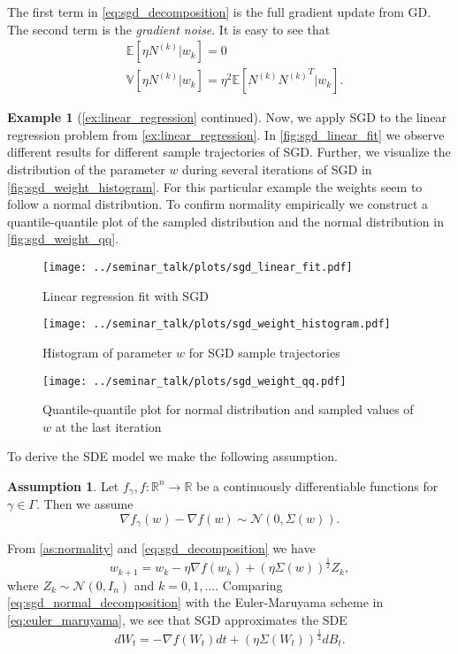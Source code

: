 \documentclass[12pt]{article}
\theoremstyle{definition}
\newtheorem{example}[example]{Example}
\newtheorem{assumption}[assumption]{Assumption}
\numberwithin{equation}{section}
\newcommand{\R}{\mathbb{R}}
\newcommand{\CN}{\mathcal{N}}
\newcommand{\ev}[1]{\mathbb{E}\left[{#1}\right]}
\newcommand{\var}[1]{\mathbb{V}\left[{#1}\right]}
\begin{document}
The first term in \eqref{eq:sgd_decomposition} is the full gradient update from GD. The second term is the \emph{gradient noise}. It is easy to see that 
\begin{align*}
  &\ev{\eta N^{(k)}|w_{k}} = 0 \\
  &\var{\eta N^{(k)}|w_{k}} = \eta^2 \ev{N^{(k)}{N^{(k)}}^T|w_{k}}.
\end{align*}
\begin{example}[\autoref{ex:linear_regression} continued]
  Now, we apply SGD to the linear regression problem from \autoref{ex:linear_regression}. In \autoref{fig:sgd_linear_fit} we observe different results for different sample trajectories of SGD.
  Further, we visualize the distribution of the parameter $w$ during several iterations of SGD in \autoref{fig:sgd_weight_histogram}. For this particular example the weights seem to follow a normal distribution. To confirm normality empirically we construct a quantile-quantile plot of the sampled distribution and the normal distribution in \autoref{fig:sgd_weight_qq}.
  \begin{figure}[htb]
    \centering
    \texttt{[image: ../seminar\_talk/plots/sgd\_linear\_fit.pdf]}
    \caption{Linear regression fit with SGD}
    \label{fig:sgd_linear_fit}
  \end{figure}
  \begin{figure}[htb]
    \centering
    \texttt{[image: ../seminar\_talk/plots/sgd\_weight\_histogram.pdf]}
    \caption{Histogram of parameter $w$ for SGD sample trajectories}
    \label{fig:sgd_weight_histogram}
  \end{figure}
  \begin{figure}[htb]
    \centering
    \texttt{[image: ../seminar\_talk/plots/sgd\_weight\_qq.pdf]}
    \caption{Quantile-quantile plot for normal distribution and sampled values of $w$ at the last iteration}
    \label{fig:sgd_weight_qq}
  \end{figure}
\end{example}
To derive the SDE model we make the following assumption.
\begin{assumption}
  \label{as:normality}
  Let $f_{\gamma}, f : \R^n \rightarrow \R$ be a continuously differentiable functions for $\gamma \in \Gamma$. Then we assume 
  \begin{equation*}
    \nabla f_{\gamma}(w) - \nabla f(w) \sim \CN(0, \Sigma(w)).
  \end{equation*}
\end{assumption}
From \autoref{as:normality} and \eqref{eq:sgd_decomposition} we have
\begin{equation}
  \label{eq:sgd_normal_decomposition}
  w_{k+1} = w_{k} - \eta \nabla f(w_{k}) + (\eta \Sigma(w))^{\frac{1}{2}} Z_k,
\end{equation}
where $Z_k \sim \CN(0,I_n)$ and $k=0,1,\dots$. Comparing \eqref{eq:sgd_normal_decomposition} with the Euler-Maruyama scheme in \eqref{eq:euler_maruyama}, we see that SGD approximates the SDE
\begin{equation}
  dW_t = -\nabla f(W_t)dt + (\eta \Sigma(W_t))^{\frac{1}{2}}dB_t.
\end{equation}
\end{document}
